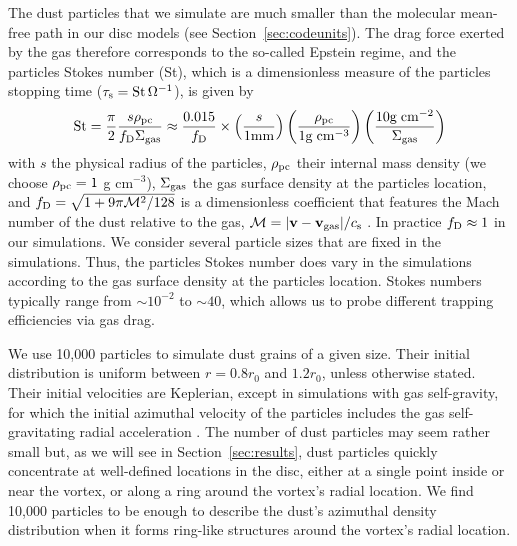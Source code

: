 \documentclass[a4paper,usenatbib]{mnras}
\begin{document}
The dust particles that we simulate are much smaller than the
molecular mean-free path in our disc models (see
Section~\ref{sec:codeunits}).  The drag force exerted by the gas
therefore corresponds to the so-called Epstein regime, and the
particles Stokes number (St), which is a dimensionless measure of the
particles stopping time (${\tau_{\rm s}} = {\rm St}\,\Omega^{-1}$), is
given by
%
\begin{equation}
{\rm St} = \frac{\pi}{2} \frac{s \rho_{\rm pc}}{f_{\rm D}\Sigma_{\rm gas}} 
\approx \frac{0.015}{f_{\rm D}} \times 
\left(\frac{s}{1{\rm mm}}\right)
\left(\frac{\rho_{\rm pc}}{1{\rm g\;cm}^{-3}}\right)
\left(\frac{10{\rm g\;cm}^{-2}}{\Sigma_{\rm gas}}\right)
\label{eq:St}
\end{equation}
%
with $s$ the physical radius of the particles, $\rho_{\rm pc}$ their
internal mass density (we choose $\rho_{\rm pc} = 1$ g cm$^{-3}$),
$\Sigma_{\rm gas}$ the gas surface density at the particles location,
and $f_{\rm D} = \sqrt{1 + 9\pi{\cal M}^2/128}$ is a dimensionless
coefficient that features the Mach number of the dust relative to the
gas, ${\cal M} = |{\bf v} - {\bf v_{\rm gas}}|/c_{\rm s}$
\citep[][${\bf v}$ and ${\bf v_{\rm gas}}$ denote the velocity vector
of the dust and gas, respectively]{SJP07}. In practice $f_{\rm D}
\approx 1$ in our simulations. We consider several particle sizes that
are fixed in the simulations. Thus, the particles Stokes number does
vary in the simulations according to the gas surface density at the
particles location. Stokes numbers typically range from
$\sim$$10^{-2}$ to $\sim$$40$, which allows us to probe different
trapping efficiencies via gas drag.

We use 10,000 particles to simulate dust grains of a given size. Their
initial distribution is uniform between $r=0.8r_0$ and $1.2r_0$,
unless otherwise stated. Their initial velocities are Keplerian,
except in simulations with gas self-gravity, for which the initial
azimuthal velocity of the particles includes the gas self-gravitating
radial acceleration \citep[much like in disc-planet simulations with
self-gravity, see][]{BM08b}.  The number of dust particles may seem
rather small but, as we will see in Section~\ref{sec:results}, dust
particles quickly concentrate at well-defined locations in the disc,
either at a single point inside or near the vortex, or along a ring
around the vortex's radial location. We find 10,000 particles to be
enough to describe the dust's azimuthal density distribution when it
forms ring-like structures around the vortex's radial location.
\end{document}
